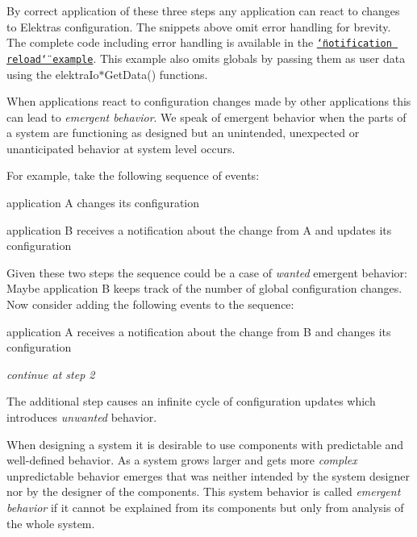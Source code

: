 By correct application of these three steps any application can react to changes to Elektra\textquotesingle{}s configuration. The snippets above omit error handling for brevity. The complete code including error handling is available in the \href{https://www.libelektra.org/examples/notificationreload}{\tt \char`\"{}notification reload\char`\"{} example}. This example also omits globals by passing them as user data using the {\ttfamily elektra\+Io$\ast$\+Get\+Data()} functions.

When applications react to configuration changes made by other applications this can lead to {\itshape emergent behavior}. We speak of emergent behavior when the parts of a system are functioning as designed but an unintended, unexpected or unanticipated behavior at system level occurs.

For example, take the following sequence of events\+:


\begin{DoxyEnumerate}
\item application {\ttfamily A} changes its configuration
\item application {\ttfamily B} receives a notification about the change from {\ttfamily A} and updates its configuration
\end{DoxyEnumerate}

Given these two steps the sequence could be a case of {\itshape wanted} emergent behavior\+: Maybe application {\ttfamily B} keeps track of the number of global configuration changes. Now consider adding the following events to the sequence\+:


\begin{DoxyEnumerate}
\item application {\ttfamily A} receives a notification about the change from {\ttfamily B} and changes its configuration
\item {\itshape continue at step 2}
\end{DoxyEnumerate}

The additional step causes an infinite cycle of configuration updates which introduces {\itshape unwanted} behavior.

When designing a system it is desirable to use components with predictable and well-\/defined behavior. As a system grows larger and gets more {\itshape complex} unpredictable behavior emerges that was neither intended by the system designer nor by the designer of the components. This system behavior is called {\itshape emergent behavior} if it cannot be explained from its components but only from analysis of the whole system.

